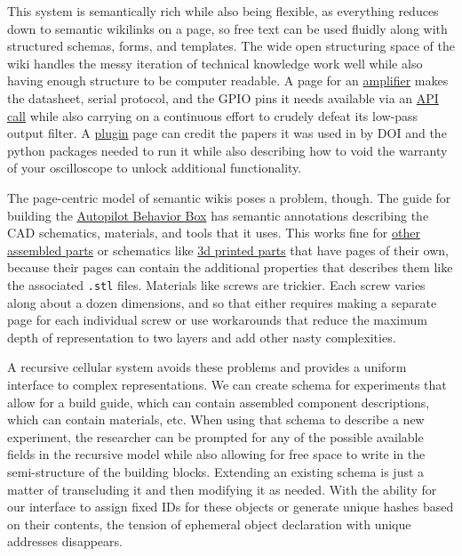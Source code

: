 This system is semantically rich while also being flexible, as
everything reduces down to semantic wikilinks on a page, so free text
can be used fluidly along with structured schemas, forms, and templates.
The wide open structuring space of the wiki handles the messy iteration
of technical knowledge work well while also having enough structure to
be computer readable. A page for an
\href{https://wiki.auto-pi-lot.com/index.php/HiFiBerry_Amp2}{amplifier}
makes the datasheet, serial protocol, and the GPIO pins it needs
available via an
\href{https://www.semantic-mediawiki.org/wiki/Help:API}{API call} while
also carrying on a continuous effort to crudely defeat its low-pass
output filter. A
\href{https://wiki.auto-pi-lot.com/index.php/Plugin:Autopilot_Paper}{plugin}
page can credit the papers it was used in by DOI and the python packages
needed to run it while also describing how to void the warranty of your
oscilloscope to unlock additional functionality.

The page-centric model of semantic wikis poses a problem, though. The
guide for building the
\href{https://wiki.auto-pi-lot.com/index.php/Autopilot_Behavior_Box}{Autopilot
Behavior Box} has semantic annotations describing the CAD schematics,
materials, and tools that it uses. This works fine for
\href{https://wiki.auto-pi-lot.com/index.php/Autopilot_Tripoke}{other
assembled parts} or schematics like
\href{https://wiki.auto-pi-lot.com/index.php/Autopilot_Nosepoke_Cap}{3d
printed parts} that have pages of their own, because their pages can
contain the additional properties that describes them like the
associated \texttt{.stl} files. Materials like screws are trickier. Each
screw varies along about a dozen dimensions, and so that either requires
making a separate page for each individual screw or use
workarounds that reduce the maximum depth of representation to two layers
and add other nasty complexities.

A recursive cellular system avoids these problems and provides a uniform
interface to complex representations. We can create schema for
experiments that allow for a build guide, which can contain assembled
component descriptions, which can contain materials, etc. When using
that schema to describe a new experiment, the researcher can be prompted
for any of the possible available fields in the recursive model while
also allowing for free space to write in the semi-structure of the
building blocks. Extending an existing schema is just a matter of
transcluding it and then modifying it as needed. With the ability for
our interface to assign fixed IDs for these objects or generate unique
hashes based on their contents, the tension of ephemeral object
declaration with unique addresses disappears.

